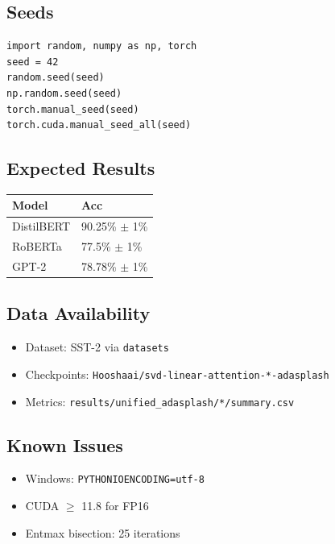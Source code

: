 \subsection{Seeds}

\begin{lstlisting}
import random, numpy as np, torch
seed = 42
random.seed(seed)
np.random.seed(seed)
torch.manual_seed(seed)
torch.cuda.manual_seed_all(seed)
\end{lstlisting}

\subsection{Expected Results}

\begin{table}[H]
\centering
\small
\begin{tabular}{ll}
\toprule
\textbf{Model} & \textbf{Acc} \\
\midrule
DistilBERT & 90.25\% $\pm$ 1\% \\
RoBERTa & 77.5\% $\pm$ 1\% \\
GPT-2 & 78.78\% $\pm$ 1\% \\
\bottomrule
\end{tabular}
\end{table}

\subsection{Data Availability}

\begin{itemize}
\item Dataset: SST-2 via \texttt{datasets}
\item Checkpoints: \texttt{Hooshaai/svd-linear-attention-*-adasplash}
\item Metrics: \texttt{results/unified\_adasplash/*/summary.csv}

\end{itemize}
\subsection{Known Issues}

\begin{itemize}
\item Windows: \texttt{PYTHONIOENCODING=utf-8}
\item CUDA $\ge$ 11.8 for FP16
\item Entmax bisection: 25 iterations
\end{itemize}


